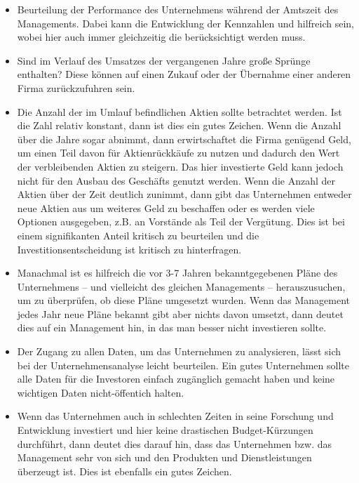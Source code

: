 \begin{itemize}
    \item Beurteilung der Performance des Unternehmens während der Amtszeit des Managements.
        Dabei kann die Entwicklung der Kennzahlen \returnOnAssets und \returnOnEquity hilfreich sein, wobei hier auch immer gleichzeitig die \financialLeverage berücksichtigt werden muss.
    \item Sind im Verlauf des Umsatzes der vergangenen Jahre große Sprünge enthalten? Diese können auf einen Zukauf oder der Übernahme einer anderen Firma zurückzufuhren sein.
    \item Die Anzahl der im Umlauf befindlichen Aktien sollte betrachtet werden. Ist die Zahl relativ konstant, dann ist dies ein gutes Zeichen. 
        Wenn die Anzahl über die Jahre sogar abnimmt, dann erwirtschaftet die Firma genügend Geld, um einen Teil davon für Aktienrückkäufe zu nutzen und dadurch den Wert der verbleibenden Aktien zu steigern.
        Das hier investierte Geld kann jedoch nicht für den Ausbau des Geschäfts genutzt werden. 
        Wenn die Anzahl der Aktien über der Zeit deutlich zunimmt, dann gibt das Unternehmen entweder neue Aktien aus um weiteres Geld zu beschaffen oder es werden viele Optionen ausgegeben, z.B. an Vorstände als Teil der Vergütung.
        Dies ist bei einem signifikanten Anteil kritisch zu beurteilen und die Investitionsentscheidung ist kritisch zu hinterfragen.
    \item Manachmal ist es hilfreich die vor 3-7 Jahren bekanntgegebenen Pläne des Unternehmens -- und vielleicht des gleichen Managements -- herauszusuchen, um zu überprüfen, ob diese Pläne umgesetzt wurden.
        Wenn das Management jedes Jahr neue Pläne bekannt gibt aber nichts davon umsetzt, dann deutet dies auf ein Management hin, in das man besser nicht investieren sollte.
    \item Der Zugang zu allen Daten, um das Unternehmen zu analysieren, lässt sich bei der Unternehmensanalyse leicht beurteilen.
        Ein gutes Unternehmen sollte alle Daten für die Investoren einfach zugänglich gemacht haben und keine wichtigen Daten nicht-öffentich halten.
    \item Wenn das Unternehmen auch in schlechten Zeiten in seine Forschung und Entwicklung investiert und hier keine drastischen Budget-Kürzungen durchführt, dann deutet dies darauf hin, dass das Unternehmen bzw. das Management sehr von sich und den Produkten und Dienstleistungen überzeugt ist.
        Dies ist ebenfalls ein gutes Zeichen.
\end{itemize}



